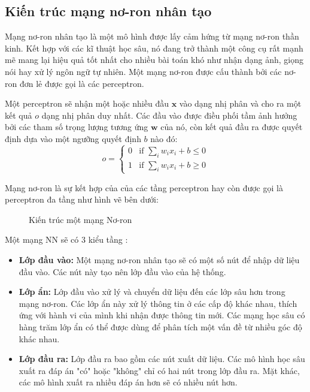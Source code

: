 \subsection{Kiến trúc mạng nơ-ron nhân tạo}
Mạng nơ-ron nhân tạo là một mô hình được lấy cảm hứng từ mạng nơ-ron thần kinh. Kết hợp với các kĩ thuật học sâu, nó đang trở thành một công cụ rất mạnh mẽ mang lại hiệu quả tốt nhất cho nhiều bài toán khó như nhận dạng ảnh, giọng nói hay xử lý ngôn ngữ tự nhiên. Một mạng nơ-ron được cấu thành bởi các nơ-ron đơn lẻ được gọi là các perceptron.

Một perceptron sẽ nhận một hoặc nhiều đầu $\mathbf{x}$ vào dạng nhị phân và cho ra một kết quả $o$ dạng nhị phân duy nhất. Các đầu vào được điều phối tầm ảnh hưởng bởi các tham số trọng lượng tương ứng $\mathbf{w}$ của nó, còn kết quả đầu ra được quyết định dựa vào một ngưỡng quyết định $b$ nào đó:
$$o = \begin{cases}
        0 & \text{if } \sum_i w_i x_i +b \leq 0 \\
        1 & \text{if } \sum_i w_i x_i +b \ge 0
    \end{cases}$$

Mạng nơ-ron là sự kết hợp của của các tầng perceptron hay còn được gọi là perceptron đa tầng như hình vẽ bên dưới:
\begin{figure}[h]
    
    \centering
    \caption{Kiến trúc một mạng Nơ-ron}

\end{figure}

Một mạng NN sẽ có 3 kiểu tầng \cite{aws-deep-learning}:
\begin{itemize}
    \item \textbf{Lớp đầu vào:} Một mạng nơ-ron nhân tạo sẽ có một số nút để nhập dữ liệu đầu vào. Các nút này tạo nên lớp đầu vào của hệ thống.
    \item \textbf{Lớp ẩn:} Lớp đầu vào xử lý và chuyển dữ liệu đến các lớp sâu hơn trong mạng nơ-ron. Các lớp ẩn này xử lý thông tin ở các cấp độ khác nhau, thích ứng với hành vi của mình khi nhận được thông tin mới. Các mạng học sâu có hàng trăm lớp ẩn có thể được dùng để phân tích một vấn đề từ nhiều góc độ khác nhau.
    \item \textbf{Lớp đầu ra:} Lớp đầu ra bao gồm các nút xuất dữ liệu. Các mô hình học sâu xuất ra đáp án "có" hoặc "không" chỉ có hai nút trong lớp đầu ra. Mặt khác, các mô hình xuất ra nhiều đáp án hơn sẽ có nhiều nút hơn.
\end{itemize}

